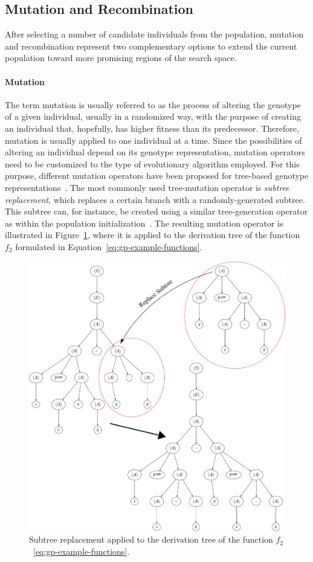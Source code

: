 \subsection{Mutation and Recombination}
\label{sec:gggp-mutation-and-recombination}
After selecting a number of candidate individuals from the population, mutation and recombination represent two complementary options to extend the current population toward more promising regions of the search space.
\paragraph{Mutation}
The term mutation is usually referred to as the process of altering the genotype of a given individual, usually in a randomized way, with the purpose of creating an individual that, hopefully, has higher fitness than its predecessor.
Therefore, mutation is usually applied to one individual at a time.
Since the possibilities of altering an individual depend on its genotype representation, mutation operators need to be customized to the type of evolutionary algorithm employed.
For this purpose, different mutation operators have been proposed for tree-based genotype representations~\cite{poli2008field,koza1994genetic}.
The most commonly used tree-mutation operator is \emph{subtree replacement}, which replaces a certain branch with a randomly-generated subtree.
This subtree can, for instance, be created using a similar tree-generation operator as within the population initialization~\cite{poli2008field}.
The resulting mutation operator is illustrated in Figure~\ref{fig:gp-replacement-mutation}, where it is applied to the derivation tree of the function $f_2$ formulated in Equation~\eqref{eq:gp-example-functions}.
\begin{figure}
	\centering
	\includegraphics[scale=0.46]{figures/trees/subtree_mutation.pdf}
	\caption{Subtree replacement applied to the derivation tree of the function $f_2$~\eqref{eq:gp-example-functions}.}
	\label{fig:gp-replacement-mutation}
\end{figure}
